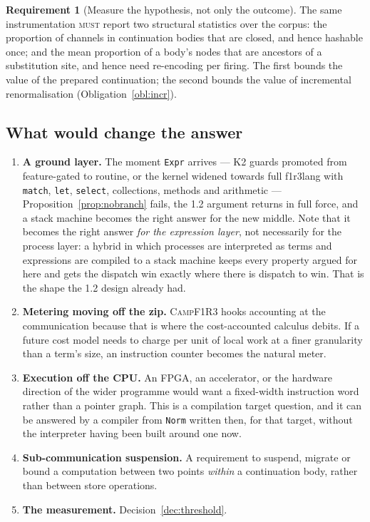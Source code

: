 \documentclass[11pt,a4paper]{article}
\newcommand{\code}[1]{\texttt{#1}}
\newcommand{\Camp}{\textsc{CampF1R3}}
\newcommand{\MUST}{\textsc{must}}
\newcommand{\Norm}{\code{Norm}}
\theoremstyle{definition}
\newtheorem{requirement}[definition]{Requirement}
\theoremstyle{plain}
\begin{document}
\begin{requirement}[Measure the hypothesis, not only the outcome]
The same instrumentation \MUST{} report two structural statistics over the
corpus: the proportion of channels in continuation bodies that are closed, and
hence hashable once; and the mean proportion of a body's nodes that are
ancestors of a substitution site, and hence need re-encoding per firing. The
first bounds the value of the prepared continuation; the second bounds the value
of incremental renormalisation (Obligation~\ref{obl:incr}).
\end{requirement}

\subsection{What would change the answer}\label{sec:change}

\begin{enumerate}[leftmargin=1.8em,nosep]
\item \textbf{A ground layer.} The moment \code{Expr} arrives --- K2 guards
promoted from feature-gated to routine, or the kernel widened towards full
f1r3lang with \code{match}, \code{let}, \code{select}, collections, methods and
arithmetic --- Proposition~\ref{prop:nobranch} fails, the 1.2 argument returns
in full force, and a stack machine becomes the right answer for the new middle.
Note that it becomes the right answer \emph{for the expression layer}, not
necessarily for the process layer: a hybrid in which processes are interpreted
as terms and expressions are compiled to a stack machine keeps every property
argued for here and gets the dispatch win exactly where there is dispatch to
win. That is the shape the 1.2 design already had.
\item \textbf{Metering moving off the zip.} \Camp{} hooks accounting at the
communication because that is where the cost-accounted calculus debits. If a
future cost model needs to charge per unit of local work at a finer granularity
than a term's size, an instruction counter becomes the natural meter.
\item \textbf{Execution off the CPU.} An FPGA, an accelerator, or the hardware
direction of the wider programme would want a fixed-width instruction word
rather than a pointer graph. This is a compilation target question, and it can
be answered by a compiler from \Norm{} written then, for that target, without
the interpreter having been built around one now.
\item \textbf{Sub-communication suspension.} A requirement to suspend, migrate
or bound a computation between two points \emph{within} a continuation body,
rather than between store operations.
\item \textbf{The measurement.} Decision~\ref{dec:threshold}.
\end{enumerate}
\end{document}
